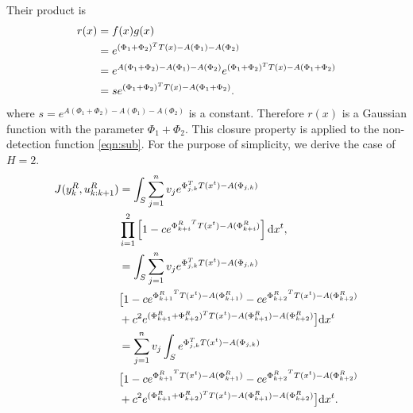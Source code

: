 \documentclass[twocolumn,10pt]{asme2e}
\begin{document}
Their product is
\begin{align}
r(x)&=f(x)g(x)\notag\\&=e^{(\Phi_1+\Phi_2)^TT(x)-A(\Phi_1)-A(\Phi_2)}\notag\\
&=e^{A(\Phi_1+\Phi_2)-A(\Phi_1)-A(\Phi_2)}e^{(\Phi_1+\Phi_2)^TT(x)-A(\Phi_1+\Phi_2)}\notag\\
&=se^{(\Phi_1+\Phi_2)^TT(x)-A(\Phi_1+\Phi_2)}.\notag
\end{align}
where $s=e^{A(\Phi_1+\Phi_2)-A(\Phi_1)-A(\Phi_2)}$ is a constant.
Therefore $r(x)$ is a Gaussian function with the parameter $\Phi_1+\Phi_2$.
This closure property is applied to the non-detection function \cref{eqn:sub}.
For the purpose of simplicity, we derive the case of $H=2$.
\begin{subequations}
	\begin{align}
	J(y^R_k,u^R_{k:k+1})&=\int_S \sum\limits_{j=1}^{n}v_j e^{\Phi_{j,k}^TT(x^t)-A(\Phi_{j,k})}\notag\\ &\prod\limits_{i=1}^{2}\left[ 1-ce^{{\Phi^R_{k+i}}^TT(x^t)-A(\Phi^R_{k+i})}\right] \mathrm{d}x^t,\\
	&=\int_S \sum\limits_{j=1}^{n}v_j e^{\Phi_{j,k}^TT(x^t)-A(\Phi_{j,k})}\notag\\
	&\big[ 1-ce^{{\Phi^R_{k+1}}^TT(x^t)-A(\Phi^R_{k+1})}-ce^{{\Phi^R_{k+2}}^TT(x^t)-A(\Phi^R_{k+2})}\notag\\&+c^2e^{(\Phi^R_{k+1}+\Phi^R_{k+2})^TT(x^t)-A(\Phi^R_{k+1})-A(\Phi^R_{k+2})}\big] \mathrm{d}x^t\notag\\
	&=\sum\limits_{j=1}^{n}v_j \int_S e^{\Phi_{j,k}^TT(x^t)-A(\Phi_{j,k})}\notag\\
	&\big[ 1-ce^{{\Phi^R_{k+1}}^TT(x^t)-A(\Phi^R_{k+1})}-ce^{{\Phi^R_{k+2}}^TT(x^t)-A(\Phi^R_{k+2})}\notag\\&+c^2e^{(\Phi^R_{k+1}+\Phi^R_{k+2})^TT(x^t)-A(\Phi^R_{k+1})-A(\Phi^R_{k+2})}\big] \mathrm{d}x^t\label{eqn:obj_2step_app}.
	\end{align}
\end{subequations}
\end{document}
